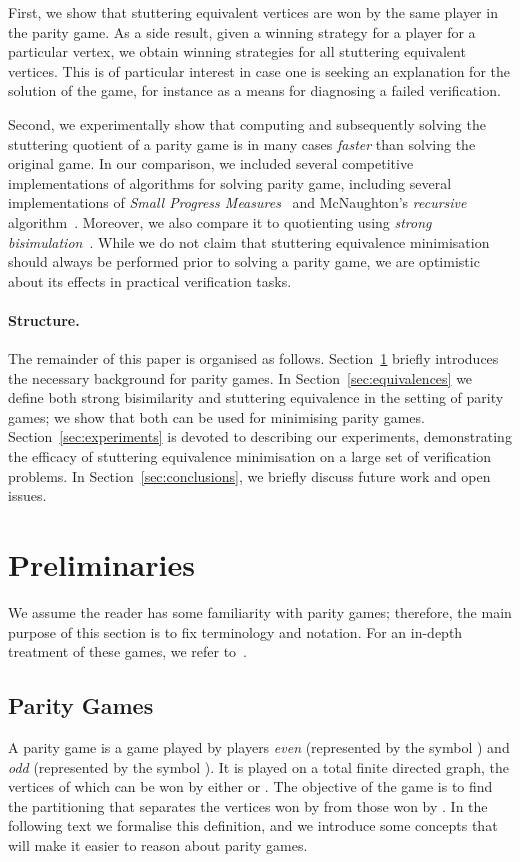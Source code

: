 \documentclass[a4paper]{llncs}
\begin{document}
First, we show that stuttering equivalent vertices are won by the same
player in the parity game.  As a side result, given a winning strategy
for a player for a particular vertex, we obtain winning strategies for
all stuttering equivalent vertices.  This is of particular interest
in case one is seeking an explanation for the solution of the game,
for instance as a means for diagnosing a failed verification.

Second, we experimentally show that computing and subsequently
solving the stuttering quotient of a parity game is in many cases
\emph{faster} than solving the original game.  In our comparison,
we included several competitive implementations of algorithms for
solving parity game, including several implementations of \emph{Small
Progress Measures}~\cite{Jur:00} and McNaughton's \emph{recursive}
algorithm~\cite{McN:93}.  Moreover, we also compare it to quotienting
using \emph{strong bisimulation}~\cite{Par:81}.  While we do not claim
that stuttering equivalence minimisation should always be performed
prior to solving a parity game, we are optimistic about its effects in
practical verification tasks.




\paragraph{Structure.} The remainder of this paper is organised
as follows. Section~\ref{sec:preliminaries} briefly introduces the
necessary background for parity games. In Section~\ref{sec:equivalences}
we define both strong bisimilarity and stuttering equivalence
in the setting of parity games; we show that both can be used for
minimising parity games. Section~\ref{sec:experiments} is devoted to
describing our experiments, demonstrating the efficacy of stuttering
equivalence minimisation on a large set of verification problems.
In Section~\ref{sec:conclusions}, we briefly discuss future work and
open issues.

\section{Preliminaries}
\label{sec:preliminaries}

We assume the reader has some familiarity with
parity games; therefore, the  main purpose of this section is to fix
terminology and notation. For an in-depth treatment of these games,
we refer to~\cite{McN:93,Zie:98}.

\subsection{Parity Games}
A parity game is a game played by players \emph{even} (represented by
the symbol ) and \emph{odd} (represented by the symbol ). 
It is played on a total finite directed graph, the vertices of which can be won
by either  or . The objective of the game is to find the 
partitioning that separates the vertices won by  from those won by .
In the following text we formalise this definition, and we introduce some
concepts that will make it easier to reason about parity games.
\end{document}

